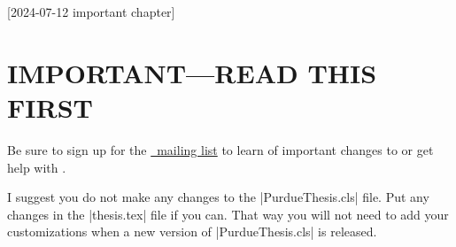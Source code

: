 [2024-07-12 important chapter]

\chapter{IMPORTANT---READ THIS FIRST}

Be sure to sign up for the
\href{https://engineering.purdue.edu/ECN/mailman/listinfo/purduethesis-list}{\PurdueThesisLogo\ mailing list}%
\cite{PurdueThesis-mailing-list}
to learn of important changes to
or get help with \PurdueThesisLogo.

I suggest you do not make any changes
to the |PurdueThesis.cls| file.
Put any changes in the |thesis.tex| file if you can.
That way you will not need to add your customizations
when a new version of |PurdueThesis.cls| is released.
